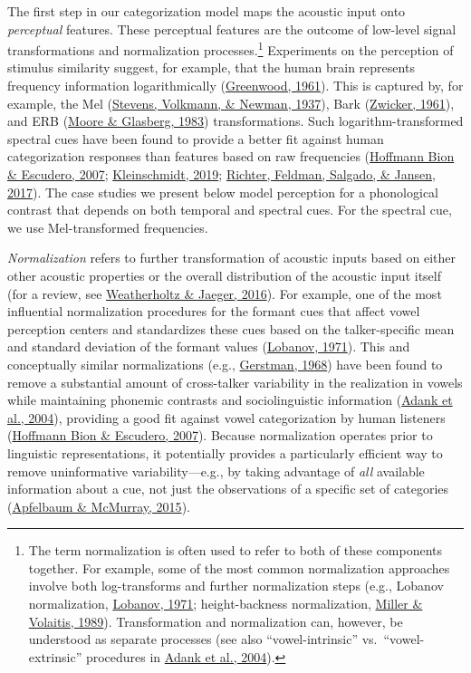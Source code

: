 \documentclass[
  11pt,
  man,floatsintext]{apa6}
\begin{document}
The first step in our categorization model maps the acoustic input onto \emph{perceptual} features. These perceptual features are the outcome of low-level signal transformations and normalization processes.\footnote{The term normalization is often used to refer to both of these components together. For example, some of the most common normalization approaches involve both log-transforms and further normalization steps (e.g., Lobanov normalization, \protect\hyperlink{ref-lobanov1971}{Lobanov, 1971}; height-backness normalization, \protect\hyperlink{ref-miller1989}{Miller \& Volaitis, 1989}). Transformation and normalization can, however, be understood as separate processes (see also ``vowel-intrinsic'' vs.~``vowel-extrinsic'' procedures in \protect\hyperlink{ref-adank2004}{Adank et al., 2004}).} Experiments on the perception of stimulus similarity suggest, for example, that the human brain represents frequency information logarithmically (\protect\hyperlink{ref-greenwood1961}{Greenwood, 1961}). This is captured by, for example, the Mel (\protect\hyperlink{ref-stevens1937}{Stevens, Volkmann, \& Newman, 1937}), Bark (\protect\hyperlink{ref-zwicker1961}{Zwicker, 1961}), and ERB (\protect\hyperlink{ref-moore-glasberg1983}{Moore \& Glasberg, 1983}) transformations. Such logarithm-transformed spectral cues have been found to provide a better fit against human categorization responses than features based on raw frequencies (\protect\hyperlink{ref-hoffmanbion-escudero2007}{Hoffmann Bion \& Escudero, 2007}; \protect\hyperlink{ref-kleinschmidt2019}{Kleinschmidt, 2019}; \protect\hyperlink{ref-richter2017}{Richter, Feldman, Salgado, \& Jansen, 2017}). The case studies we present below model perception for a phonological contrast that depends on both temporal and spectral cues. For the spectral cue, we use Mel-transformed frequencies.

\emph{Normalization} refers to further transformation of acoustic inputs based on either other acoustic properties or the overall distribution of the acoustic input itself (for a review, see \protect\hyperlink{ref-weatherholtz-jaeger2016}{Weatherholtz \& Jaeger, 2016}). For example, one of the most influential normalization procedures for the formant cues that affect vowel perception centers and standardizes these cues based on the talker-specific mean and standard deviation of the formant values (\protect\hyperlink{ref-lobanov1971}{Lobanov, 1971}). This and conceptually similar normalizations (e.g., \protect\hyperlink{ref-gerstman1968}{Gerstman, 1968}) have been found to remove a substantial amount of cross-talker variability in the realization in vowels while maintaining phonemic contrasts and sociolinguistic information (\protect\hyperlink{ref-adank2004}{Adank et al., 2004}), providing a good fit against vowel categorization by human listeners (\protect\hyperlink{ref-hoffmanbion-escudero2007}{Hoffmann Bion \& Escudero, 2007}). Because normalization operates prior to linguistic representations, it potentially provides a particularly efficient way to remove uninformative variability---e.g., by taking advantage of \emph{all} available information about a cue, not just the observations of a specific set of categories (\protect\hyperlink{ref-apfelbaum-mcmurray2015}{Apfelbaum \& McMurray, 2015}).
\end{document}
